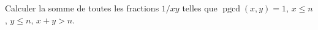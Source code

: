 Calculer la somme de toutes les fractions $1/xy$ telles que $\operatorname{pgcd}(x, y) = 1$, $x \leq n$, $y \leq n$, $x + y > n$.
